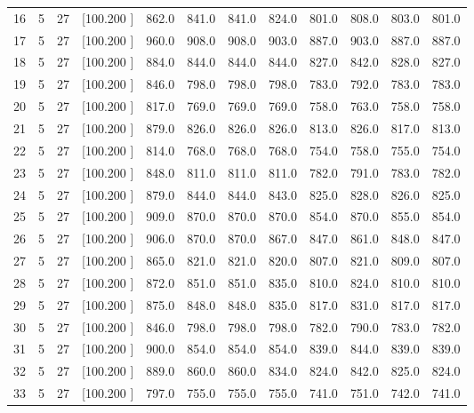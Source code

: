\documentclass[12pt,a4paper]{article}
\begin{document}
\begin{center}
{\begin{tabular}{r r r r r r r r r r r r}
  16&  5& 27&[100.200   ]&   862.0&   841.0&   841.0&   824.0&   801.0&   808.0&   803.0&   801.0\\[-0.02in]
  17&  5& 27&[100.200   ]&   960.0&   908.0&   908.0&   903.0&   887.0&   903.0&   887.0&   887.0\\[-0.02in]
  18&  5& 27&[100.200   ]&   884.0&   844.0&   844.0&   844.0&   827.0&   842.0&   828.0&   827.0\\[-0.02in]
  19&  5& 27&[100.200   ]&   846.0&   798.0&   798.0&   798.0&   783.0&   792.0&   783.0&   783.0\\[-0.02in]
  20&  5& 27&[100.200   ]&   817.0&   769.0&   769.0&   769.0&   758.0&   763.0&   758.0&   758.0\\[-0.02in]
  21&  5& 27&[100.200   ]&   879.0&   826.0&   826.0&   826.0&   813.0&   826.0&   817.0&   813.0\\[-0.02in]
  22&  5& 27&[100.200   ]&   814.0&   768.0&   768.0&   768.0&   754.0&   758.0&   755.0&   754.0\\[-0.02in]
  23&  5& 27&[100.200   ]&   848.0&   811.0&   811.0&   811.0&   782.0&   791.0&   783.0&   782.0\\[-0.02in]
  24&  5& 27&[100.200   ]&   879.0&   844.0&   844.0&   843.0&   825.0&   828.0&   826.0&   825.0\\[-0.02in]
  25&  5& 27&[100.200   ]&   909.0&   870.0&   870.0&   870.0&   854.0&   870.0&   855.0&   854.0\\[-0.02in]
  26&  5& 27&[100.200   ]&   906.0&   870.0&   870.0&   867.0&   847.0&   861.0&   848.0&   847.0\\[-0.02in]
  27&  5& 27&[100.200   ]&   865.0&   821.0&   821.0&   820.0&   807.0&   821.0&   809.0&   807.0\\[-0.02in]
  28&  5& 27&[100.200   ]&   872.0&   851.0&   851.0&   835.0&   810.0&   824.0&   810.0&   810.0\\[-0.02in]
  29&  5& 27&[100.200   ]&   875.0&   848.0&   848.0&   835.0&   817.0&   831.0&   817.0&   817.0\\[-0.02in]
  30&  5& 27&[100.200   ]&   846.0&   798.0&   798.0&   798.0&   782.0&   790.0&   783.0&   782.0\\[-0.02in]
  31&  5& 27&[100.200   ]&   900.0&   854.0&   854.0&   854.0&   839.0&   844.0&   839.0&   839.0\\[-0.02in]
  32&  5& 27&[100.200   ]&   889.0&   860.0&   860.0&   834.0&   824.0&   842.0&   825.0&   824.0\\[-0.02in]
  33&  5& 27&[100.200   ]&   797.0&   755.0&   755.0&   755.0&   741.0&   751.0&   742.0&   741.0\\[-0.02in]

\end{tabular}}
\end{center}
\end{document}
